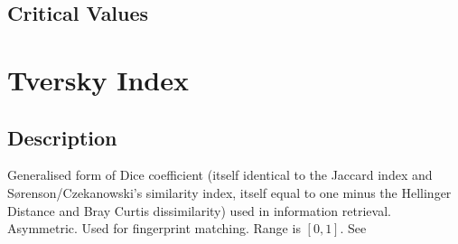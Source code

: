 \documentclass[11pt]{article}
\begin{document}
\subsection{Critical Values}















\section{Tversky Index}
\label{section:tverskyindex}
\subsection{Description}
Generalised form of Dice coefficient (itself identical to the Jaccard index and S\o renson/Czekanowski's similarity index, itself equal to one minus the Hellinger Distance and Bray Curtis dissimilarity) used in information retrieval.  
Asymmetric. 
Used for fingerprint matching.  
Range is $[0, 1]$.  
See \cite{tversky1977features}

\end{document}
